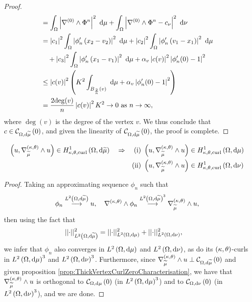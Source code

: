 \begin{proof}
\begin{align*}
		&= \integral{\ddom}{ \abs{ \grad^{(0)}\wedge\Phi^n}^2 }{\ddmes}
		+ \integral{\ddom}{ \abs{ \grad^{(0)}\wedge\Phi^n - c_{\nu} }^2 }{\nu} \\
		&= \abs{c_1}^2\integral{\ddom}{ \abs{\phi'_n\bracs{x_2-v_2}}^2 }{\ddmes}
		+ \abs{c_2}^2\integral{\ddom}{ \abs{\phi'_n\bracs{v_1-x_1}}^2 }{\ddmes} \\
		&\quad + \abs{c_3}^2\integral{\ddom}{ \abs{\phi'_n\bracs{x_1-v_1}}^2 }{\ddmes}
		+ \alpha_v\abs{c(v)}^2\abs{\phi'_n(0)-1}^2 \\
		&\leq \abs{c(v)}^2 \bracs{ K^2\integral{B_{\frac{2}{n}}(v)}{ }{\ddmes}
		+ \alpha_v\abs{\phi'_n(0)-1}^2 } \\
		&= \frac{2\mathrm{deg}(v)}{n}\abs{c(v)}^2 K^2 \rightarrow 0 \toInfty{n},
	\end{align*}
	where $\mathrm{\deg}(v)$ is the degree of the vertex $v$.
	We thus conclude that $c\in\curlZero{\ddom}{\dddmes}$, and given the linearity of $\curlZero{\ddom}{\dddmes}$, the proof is complete.
\end{proof}

\begin{theorem} \label{thm:ThickVertexTangCurlImplication}
	\begin{align*}
		\bracs{u, \ktcurl{\dddmes}u}\in\ktcurlSob{\ddom}{\dddmes}
		\quad\Rightarrow\quad
		\mathrm{(i)} &\ \bracs{u, \ktcurl{\dddmes}u}\in\ktcurlSob{\ddom}{\ddmes} \\
		\mathrm{(ii)} &\ \bracs{u, \ktcurl{\dddmes}u}\in\ktcurlSob{\ddom}{\nu}
	\end{align*}
\end{theorem}
\begin{proof}
	Taking an approximating sequence $\phi_n$ such that
	\begin{align*}
		\phi_n \lconv{\ltwo{\ddom}{\dddmes}} u, \quad \ktcurl{}\phi_n\lconv{\ltwo{\ddom}{\dddmes}^3}\ktcurl{\dddmes}u,
	\end{align*}
	then using the fact that
	\begin{align*}
		\norm{\cdot}_{\ltwo{\ddom}{\dddmes}}^2 &= \norm{\cdot}_{\ltwo{\ddom}{\ddmes}}^2 + \norm{\cdot}_{\ltwo{\ddom}{\nu}}^2,
	\end{align*}
	we infer that $\phi_n$ also converges in $\ltwo{\ddom}{\ddmes}$ and $\ltwo{\ddom}{\nu}$, as do its $\kt$-curls in $\ltwo{\ddom}{\ddmes}^3$ and $\ltwo{\ddom}{\nu}^3$.
	Furthermore, since $\ktcurl{\dddmes}u \perp \curlZero{\ddom}{\dddmes}$ and given proposition \ref{prop:ThickVertexCurlZeroCharacterisation}, we have that $\ktcurl{\dddmes}u$ is orthogonal to $\curlZero{\ddom}{\ddmes}$ (in $\ltwo{\ddom}{\ddmes}^3$) and to $\curlZero{\ddom}{\nu}$ (in $\ltwo{\ddom}{\nu}^3$), and we are done. 
\end{proof}

